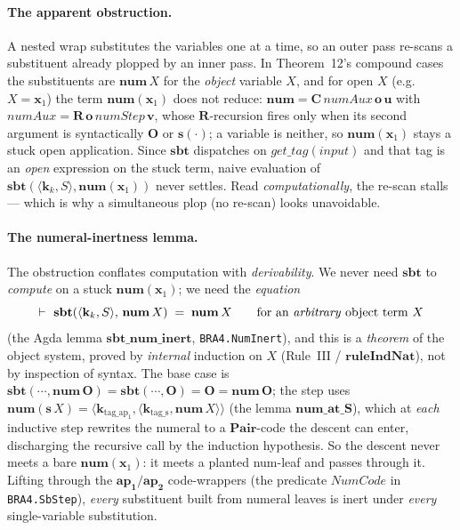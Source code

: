 \documentclass[11pt]{article}
\theoremstyle{plain}
\theoremstyle{definition}
\theoremstyle{remark}
\newcommand{\sbt}{\mathbf{sbt}}
\newcommand{\num}{\mathbf{num}}
\newcommand{\Pair}{\mathbf{Pair}}
\newcommand{\seq}[1]{\langle #1 \rangle}
\begin{document}
\paragraph{The apparent obstruction.}  A nested wrap substitutes the
variables one at a time, so an outer pass re-scans a substituent already
plopped by an inner pass.  In Theorem~12's compound cases the substituents
are $\num\,X$ for the \emph{object} variable $X$, and for open $X$ (e.g.\
$X=\mathbf{x}_1$) the term $\num(\mathbf{x}_1)$ does not reduce:
$\num = \mathbf{C}\,\mathit{numAux}\,\mathbf{o}\,\mathbf{u}$ with
$\mathit{numAux}=\mathbf{R}\,\mathbf{o}\,\mathit{numStep}\,\mathbf{v}$, whose
$\mathbf{R}$-recursion fires only when its second argument is syntactically
$\mathbf{O}$ or $\mathbf{s}(\cdot)$; a variable is neither, so
$\num(\mathbf{x}_1)$ stays a stuck open application.  Since $\sbt$ dispatches
on $\mathit{get\_tag}(\mathit{input})$ and that tag is an \emph{open}
expression on the stuck term, naive evaluation of
$\sbt(\seq{\mathbf{k}_k, S}, \num(\mathbf{x}_1))$ never settles.  Read
\emph{computationally}, the re-scan stalls --- which is why a simultaneous
plop (no re-scan) looks unavoidable.

\paragraph{The numeral-inertness lemma.}  The obstruction conflates
computation with \emph{derivability}.  We never need $\sbt$ to \emph{compute}
on a stuck $\num(\mathbf{x}_1)$; we need the \emph{equation}
\[
\vdash\ \sbt(\seq{\mathbf{k}_k, S},\, \num\,X) \;=\; \num\,X
\qquad\text{for an \emph{arbitrary} object term } X
\]
(the Agda lemma $\mathbf{sbt\_num\_inert}$, \verb|BRA4.NumInert|), and this is
a \emph{theorem} of the object system, proved by \emph{internal} induction on
$X$ (Rule~III / $\mathbf{ruleIndNat}$), not by inspection of syntax.  The
base case is $\sbt(\cdots, \num\,\mathbf{O}) = \sbt(\cdots,\mathbf{O}) =
\mathbf{O} = \num\,\mathbf{O}$; the step uses $\num(\mathbf{s}\,X) =
\seq{\mathbf{k}_{\mathrm{tag\_ap_1}}, \seq{\mathbf{k}_{\mathrm{tag\_s}},
\num\,X}}$ (the lemma $\mathbf{num\_at\_S}$), which at \emph{each} inductive
step rewrites the numeral to a $\Pair$-code the descent can enter,
discharging the recursive call by the induction hypothesis.  So the descent
never meets a bare $\num(\mathbf{x}_1)$: it meets a planted num-leaf and
passes through it.  Lifting through the $\mathbf{ap_1}/\mathbf{ap_2}$
code-wrappers (the predicate $\mathit{NumCode}$ in \verb|BRA4.SbStep|),
\emph{every} substituent built from numeral leaves is inert under
\emph{every} single-variable substitution.
\end{document}
